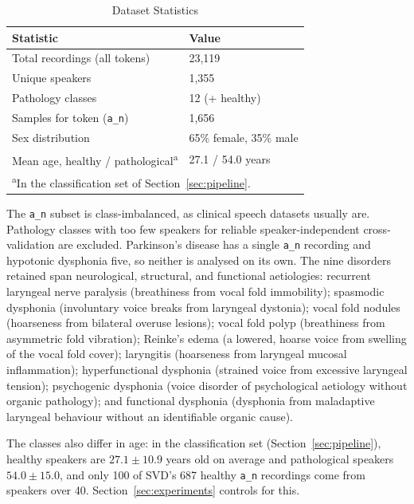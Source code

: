 \documentclass[runningheads]{llncs}
\begin{document}
  \begin{table}[htbp]
  \centering
  \caption{Dataset Statistics}
  \label{tab:dataset_stats}
  \begin{tabular}{ll}
  \toprule
  \textbf{Statistic} & \textbf{Value} \\
  \midrule
  Total recordings (all tokens) & 23,119 \\
  Unique speakers & 1,355 \\
  Pathology classes & 12 (+ healthy) \\
  Samples for token (\texttt{a\_n}) & 1,656 \\
  Sex distribution & 65\% female, 35\% male \\
  Mean age, healthy / pathological\textsuperscript{a} & 27.1 / 54.0 years \\
  \bottomrule
  \multicolumn{2}{l}{\scriptsize \textsuperscript{a}In the classification set of Section~\ref{sec:pipeline}.}
  \end{tabular}
  \end{table}

  The \texttt{a\_n} subset is class-imbalanced, as clinical speech datasets usually are. Pathology classes with too few speakers for reliable speaker-independent cross-validation are excluded. Parkinson's disease has a single \texttt{a\_n} recording and hypotonic dysphonia five, so neither is analysed on its own. The nine disorders retained span neurological, structural, and functional aetiologies: recurrent laryngeal nerve paralysis (breathiness from vocal fold immobility); spasmodic dysphonia (involuntary voice breaks from laryngeal dystonia); vocal fold nodules (hoarseness from bilateral overuse lesions); vocal fold polyp (breathiness from asymmetric fold vibration); Reinke's edema (a lowered, hoarse voice from swelling of the vocal fold cover); laryngitis (hoarseness from laryngeal mucosal inflammation); hyperfunctional dysphonia (strained voice from excessive laryngeal tension); psychogenic dysphonia (voice disorder of psychological aetiology without organic pathology); and functional dysphonia (dysphonia from maladaptive laryngeal behaviour without an identifiable organic cause).

  The classes also differ in age: in the classification set (Section~\ref{sec:pipeline}), healthy speakers are $27.1 \pm 10.9$ years old on average and pathological speakers $54.0 \pm 15.0$, and only 100 of SVD's 687 healthy \texttt{a\_n} recordings come from speakers over 40. Section~\ref{sec:experiments} controls for this.
\end{document}
